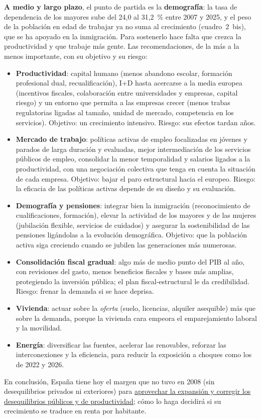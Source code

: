 \begin{examen}
\textbf{A medio y largo plazo}, el punto de partida es la \textbf{demografía}: la tasa de dependencia de los mayores sube del 24,0 al 31,2~\% entre 2007 y 2025, y el peso de la población en edad de trabajar ya no suma al crecimiento (cuadro~2~bis), que se ha apoyado en la inmigración. Para sostenerlo hace falta que crezca la productividad y que trabaje más gente. Las recomendaciones, de la más a la menos importante, con su objetivo y su riesgo:
\begin{itemize}
\item \textbf{Productividad}: capital humano (menos abandono escolar, formación profesional dual, recualificación), I+D hasta acercarse a la media europea (incentivos fiscales, colaboración entre universidades y empresas, capital riesgo) y un entorno que permita a las empresas crecer (menos trabas regulatorias ligadas al tamaño, unidad de mercado, competencia en los servicios). Objetivo: un crecimiento intensivo. Riesgo: sus efectos tardan años.
\item \textbf{Mercado de trabajo}: políticas activas de empleo focalizadas en jóvenes y parados de larga duración y evaluadas, mejor intermediación de los servicios públicos de empleo, consolidar la menor temporalidad y salarios ligados a la productividad, con una negociación colectiva que tenga en cuenta la situación de cada empresa. Objetivo: bajar el paro estructural hacia el europeo. Riesgo: la eficacia de las políticas activas depende de su diseño y su evaluación.
\item \textbf{Demografía y pensiones}: integrar bien la inmigración (reconocimiento de cualificaciones, formación), elevar la actividad de los mayores y de las mujeres (jubilación flexible, servicios de cuidados) y asegurar la sostenibilidad de las pensiones ligándolas a la evolución demográfica. Objetivo: que la población activa siga creciendo cuando se jubilen las generaciones más numerosas.
\item \textbf{Consolidación fiscal gradual}: algo más de medio punto del PIB al año, con revisiones del gasto, menos beneficios fiscales y bases más amplias, protegiendo la inversión pública; el plan fiscal-estructural le da credibilidad. Riesgo: frenar la demanda si se hace deprisa.
\item \textbf{Vivienda}: actuar sobre la \emph{oferta} (suelo, licencias, alquiler asequible) más que sobre la demanda, porque la vivienda cara empeora el emparejamiento laboral y la movilidad.
\item \textbf{Energía}: diversificar las fuentes, acelerar las renovables, reforzar las interconexiones y la eficiencia, para reducir la exposición a choques como los de 2022 y 2026.
\end{itemize}
En conclusión, España tiene hoy el margen que no tuvo en 2008 (sin desequilibrios privados ni exteriores) para \uline{aprovechar la expansión y corregir los desequilibrios públicos y de productividad}; cómo lo haga decidirá si su crecimiento se traduce en renta por habitante.
\end{examen}

